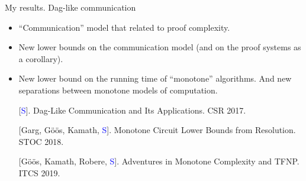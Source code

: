 \begin{frame}{My results. Dag-like communication}
    \begin{itemize}   
        \item ``Communication'' model that related to proof complexity.
        \pause
        \item New lower bounds on the communication model (and on the proof systems as a corollary).
        \pause
        \item New lower bound on the running time of ``monotone'' algorithms. And new separations between
            monotone models of computation.
    \end{itemize}

    \pause
    \begin{enumerate}
        \item[] [\textcolor{blue}{S}]. Dag-Like Communication and Its Applications. CSR 2017.
        \item[] [Garg, G\"{o}\"{o}s, Kamath, \textcolor{blue}{S}]. Monotone Circuit Lower Bounds from
            Resolution. STOC 2018.
        \item[] [G\"{o}\"{o}s, Kamath, Robere, \textcolor{blue}{S}]. Adventures in Monotone Complexity and
            TFNP. ITCS 2019.
    \end{enumerate}
\end{frame}


